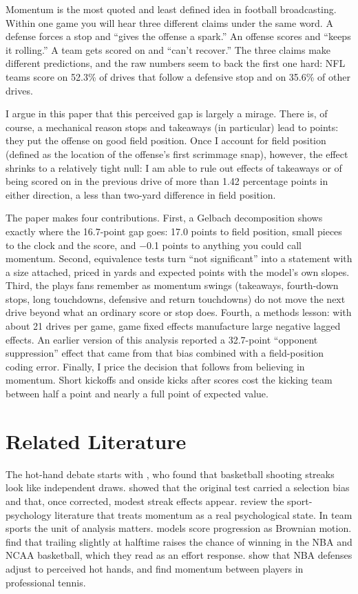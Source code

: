 \documentclass[11pt]{article}
\begin{document}
Momentum is the most quoted and least defined idea in football broadcasting. Within one game you will hear three different claims under the same word. A defense forces a stop and ``gives the offense a spark.'' An offense scores and ``keeps it rolling.'' A team gets scored on and ``can't recover.'' The three claims make different predictions, and the raw numbers seem to back the first one hard: NFL teams score on 52.3\% of drives that follow a defensive stop and on 35.6\% of other drives.

I argue in this paper that this perceived gap is largely a mirage. There is, of course, a mechanical reason stops and takeaways (in particular) lead to points: they put the offense on good field position. Once I account for field position (defined as the location of the offense's first scrimmage snap), however, the effect shrinks to a relatively tight null: I am able to rule out effects of takeaways or of being scored on in the previous drive of more than 1.42 percentage points in either direction, a less than two-yard difference in field position.

The paper makes four contributions. First, a Gelbach decomposition shows exactly where the 16.7-point gap goes: 17.0 points to field position, small pieces to the clock and the score, and $-$0.1 points to anything you could call momentum. Second, equivalence tests turn ``not significant'' into a statement with a size attached, priced in yards and expected points with the model's own slopes. Third, the plays fans remember as momentum swings (takeaways, fourth-down stops, long touchdowns, defensive and return touchdowns) do not move the next drive beyond what an ordinary score or stop does. Fourth, a methods lesson: with about 21 drives per game, game fixed effects manufacture large negative lagged effects. An earlier version of this analysis reported a 32.7-point ``opponent suppression'' effect that came from that bias combined with a field-position coding error. Finally, I price the decision that follows from believing in momentum. Short kickoffs and onside kicks after scores cost the kicking team between half a point and nearly a full point of expected value.

\section{Related Literature}\label{sec:lit}

The hot-hand debate starts with \citet{gilovich1985hot}, who found that basketball shooting streaks look like independent draws. \citet{miller2018surprised} showed that the original test carried a selection bias and that, once corrected, modest streak effects appear. \citet{bareli2006twelve} review the sport-psychology literature that treats momentum as a real psychological state. In team sports the unit of analysis matters. \citet{stern1994probabilities} models score progression as Brownian motion. \citet{berger2011hot} find that trailing slightly at halftime raises the chance of winning in the NBA and NCAA basketball, which they read as an effort response. \citet{csapo2014hand} show that NBA defenses adjust to perceived hot hands, and \citet{gauriot2019does} find momentum between players in professional tennis.
\end{document}
